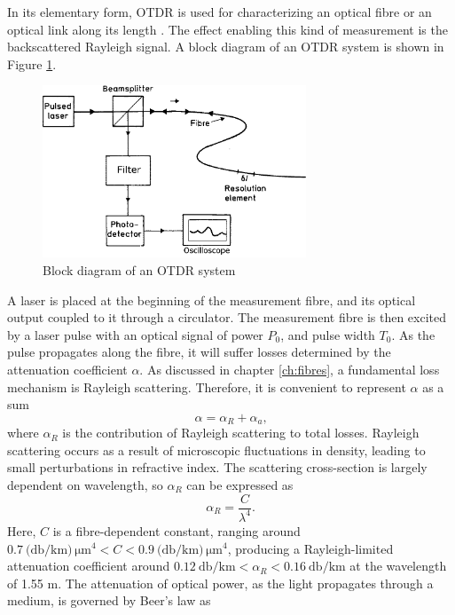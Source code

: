 \documentclass{standalone}
\begin{document}
In its elementary form, OTDR is used for characterizing an optical fibre or an optical link along its length \cite{UnderstandingOTDRs2000}. The effect enabling this kind of measurement is the backscattered Rayleigh signal. A block diagram of an OTDR system is shown in Figure \ref{fig:otdr_block}.
\begin{figure}[h]
	\centering
	\includegraphics[width=0.7\textwidth]{otdr_block.png}
	\caption{Block diagram of an OTDR system \cite{Rogers1999}}
	\label{fig:otdr_block}
\end{figure}
A laser is placed at the beginning of the measurement fibre, and its optical output coupled to it through a circulator. The measurement fibre is then excited by a laser pulse with an optical signal of power $P_0$, and pulse width $T_0$. As the pulse propagates along the fibre, it will suffer losses determined by the attenuation coefficient $\alpha$. As discussed in chapter \ref{ch:fibres}, a fundamental loss mechanism is Rayleigh scattering. Therefore, it is convenient to represent $\alpha$ as a sum \cite{agrawal}
\begin{equation}
\alpha = \alpha_R + \alpha_a \textrm{,}
\end{equation}
where $\alpha_R$ is the contribution of Rayleigh scattering to total losses. Rayleigh scattering occurs as a result of microscopic fluctuations in density, leading to small perturbations in refractive index. The scattering cross-section is largely dependent on wavelength, so $\alpha_R$ can be expressed as
\begin{equation}
\alpha_R = \frac{C}{\lambda^4} \textrm{.}
\end{equation}
Here, $C$ is a fibre-dependent constant, ranging around $\SI{0.7}{(\decibel / \kilo \meter) \, \micro \meter ^4} < C < \SI{0.9}{(\decibel / \kilo \meter) \, \micro \meter ^4}$, producing a Rayleigh-limited attenuation coefficient around $\SI{0.12}{\decibel / \kilo \meter} < \alpha_R < \SI{0.16}{\decibel / \kilo \meter}$ at the wavelength of 1.55 \textmu m. The attenuation of optical power, as the light propagates through a medium, is governed by Beer's law as
\end{document}
